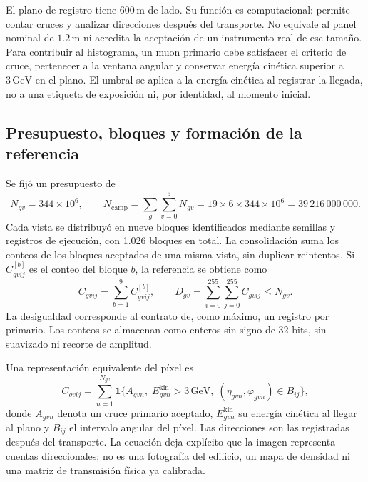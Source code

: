\documentclass[11pt,a4paper]{article}
\newcommand{\ind}{\mathbf{1}}
\begin{document}
El plano de registro tiene $600\,\mathrm m$ de lado. Su función es computacional: permite contar cruces y analizar direcciones después del transporte. No equivale al panel nominal de $1.2\,\mathrm m$ ni acredita la aceptación de un instrumento real de ese tamaño. Para contribuir al histograma, un muon primario debe satisfacer el criterio de cruce, pertenecer a la ventana angular y conservar energía cinética superior a $3\,\mathrm{GeV}$ en el plano. El umbral se aplica a la energía cinética al registrar la llegada, no a una etiqueta de exposición ni, por identidad, al momento inicial.

\subsection{Presupuesto, bloques y formación de la referencia}

Se fijó un presupuesto de
\begin{equation}
 N_{gv}=344\times10^6,\qquad
 N_{\mathrm{camp}}=\sum_g\sum_{v=0}^{5}N_{gv}
 =19\times6\times344\times10^6
 =39\,216\,000\,000.
 \label{eq:presupuesto}
\end{equation}
Cada vista se distribuyó en nueve bloques identificados mediante semillas y registros de ejecución, con 1.026 bloques en total. La consolidación suma los conteos de los bloques aceptados de una misma vista, sin duplicar reintentos. Si $C^{[b]}_{gvij}$ es el conteo del bloque $b$, la referencia se obtiene como
\begin{equation}
 C_{gvij}=\sum_{b=1}^{9}C^{[b]}_{gvij},\qquad
 D_{gv}=\sum_{i=0}^{255}\sum_{j=0}^{255}C_{gvij}\leq N_{gv}.
 \label{eq:conteos}
\end{equation}
La desigualdad corresponde al contrato de, como máximo, un registro por primario. Los conteos se almacenan como enteros sin signo de 32 bits, sin suavizado ni recorte de amplitud.

Una representación equivalente del píxel es
\begin{equation}
 C_{gvij}=\sum_{n=1}^{N_{gv}}\ind\{A_{gvn},\;E^{\mathrm{kin}}_{gvn}>3\,\mathrm{GeV},
 \;(\eta_{gvn},\varphi_{gvn})\in B_{ij}\},
 \label{eq:indicador}
\end{equation}
donde $A_{gvn}$ denota un cruce primario aceptado, $E^{\mathrm{kin}}_{gvn}$ su energía cinética al llegar al plano y $B_{ij}$ el intervalo angular del píxel. Las direcciones son las registradas después del transporte. La ecuación deja explícito que la imagen representa cuentas direccionales; no es una fotografía del edificio, un mapa de densidad ni una matriz de transmisión física ya calibrada.
\end{document}
